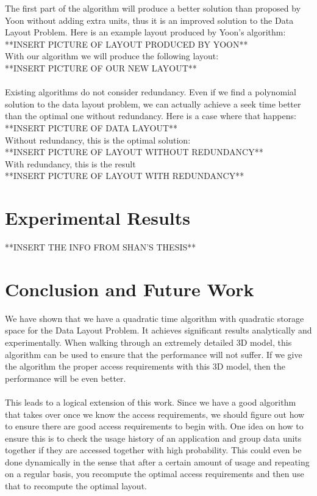 \documentclass[11pt,psfig]{article}
\begin{document}
The first part of the algorithm will produce a better solution than proposed by Yoon without adding extra units, thus it is an improved solution to the Data Layout Problem. Here is an example layout produced by Yoon's algorithm:\\
**INSERT PICTURE OF LAYOUT PRODUCED BY YOON**\\
With our algorithm we will produce the following layout: \\
**INSERT PICTURE OF OUR NEW LAYOUT**\\
\\
Existing algorithms do not consider redundancy. Even if we find a polynomial solution to the data layout problem, we can actually achieve a seek time better than the optimal one without redundancy. Here is a case where that happens:\\
**INSERT PICTURE OF DATA LAYOUT**\\
Without redundancy, this is the optimal solution:\\
**INSERT PICTURE OF LAYOUT WITHOUT REDUNDANCY**\\
With redundancy, this is the result\\
**INSERT PICTURE OF LAYOUT WITH REDUNDANCY**\\

\section*{Experimental Results}

**INSERT THE INFO FROM SHAN'S THESIS**

\section*{Conclusion and Future Work}

We have shown that we have a quadratic time algorithm with quadratic storage space for the Data Layout Problem. It achieves significant results analytically and experimentally. When walking through an extremely detailed 3D model, this algorithm can be used to ensure that the performance will not suffer. If we give the algorithm the proper access requirements with this 3D model, then the performance will be even better.\\
\\
This leads to a logical extension of this work. Since we have a good algorithm that takes over once we know the access requirements, we should figure out how to ensure there are good access requirements to begin with. One idea on how to ensure this is to check the usage history of an application and group data units together if they are accessed together with high probability. This could even be done dynamically in the sense that after a certain amount of usage and repeating on a regular basis, you recompute the optimal access requirements and then use that to recompute the optimal layout. 
\end{document}
